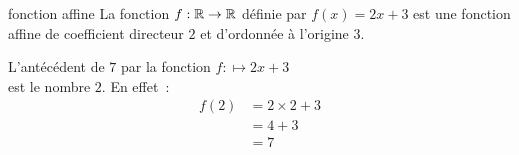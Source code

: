 \begin{exemple}{}{fonction affine}
    La fonction \(f : \mathbb{R} \to \mathbb{R}\) définie par \(f(x) = 2x + 3\) est une fonction affine de coefficient directeur \(2\) et d'ordonnée à l'origine \(3\).
\end{exemple}

\begin{exemple}{}{}
    L'antécédent de \(7\) par la fonction $f : \mapsto 2x + 3$ \\ est le nombre \(2\). En effet~:
    \begin{align*}
        f(2) & = 2 \times 2 + 3 \\
             & = 4 + 3 \\
             & = 7
    \end{align*}
\end{exemple}

